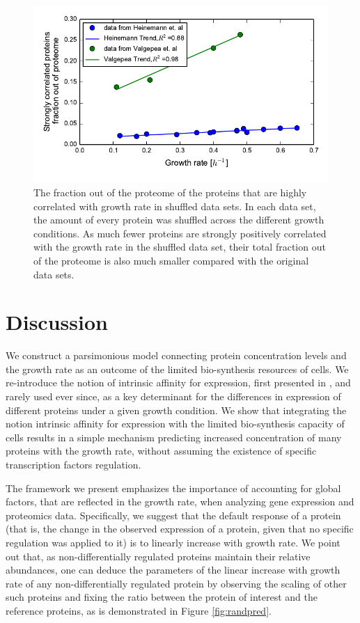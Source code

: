 \documentclass[a4paper]{article}
\begin{document}
\begin{figure}[H]
\begin{center}
\includegraphics[width=1\columnwidth]{shuffleGlobalClusterGRFit.pdf}
\caption{\label{fig:shuffledglobgrcorr}
The fraction out of the proteome of the proteins that are highly correlated with growth rate in shuffled data sets.
In each data set, the amount of every protein was shuffled across the different growth conditions.
As much fewer proteins are strongly positively correlated with the growth rate in the shuffled data set, their total fraction out of the proteome is also much smaller compared with the original data sets.}
\end{center}
\end{figure}

\section{Discussion}
We construct a parsimonious model connecting protein concentration levels and the growth rate as an outcome of the limited bio-synthesis resources of cells. 
We re-introduce the notion of intrinsic affinity for expression, first presented in \cite{Maaloe1969}, and rarely used ever since, as a key determinant for the differences in expression of different proteins under a given growth condition.
We show that integrating the notion intrinsic affinity for expression with the limited bio-synthesis capacity of cells results in a simple mechanism predicting increased concentration of many proteins with the growth rate, without assuming the existence of specific transcription factors regulation.

The framework we present emphasizes the importance of accounting for global factors, that are reflected in the growth rate, when analyzing gene expression and proteomics data.
Specifically, we suggest that the default response of a protein (that is, the change in the observed expression of a protein, given that no specific regulation was applied to it) is to linearly increase with growth rate.
We point out that, as non-differentially regulated proteins maintain their relative abundances, one can deduce the parameters of the linear increase with growth rate of any non-differentially regulated protein by observing the scaling of other such proteins and fixing the ratio between the protein of interest and the reference proteins, as is demonstrated in Figure \ref{fig:randpred}.
\end{document}
